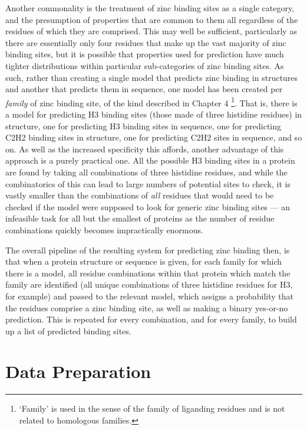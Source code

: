 Another commonality is the treatment of zinc binding sites as a single category, and the presumption of properties that are common to them all regardless of the residues of which they are comprised. This may well be sufficient, particularly as there are essentially only four residues that make up the vast majority of zinc binding sites, but it is possible that properties used for prediction have much tighter distributions within particular sub-categories of zinc binding sites. As such, rather than creating a single model that predicts zinc binding in structures and another that predicts them in sequence, one model has been created per \emph{family} of zinc binding site, of the kind described in Chapter 4 \footnote{`Family' is used in the sense of the family of liganding residues and is not related to homologous families.}. That is, there is a model for predicting H3 binding sites (those made of three histidine residues) in structure, one for predicting H3 binding sites in sequence, one for predicting C2H2 binding sites in structure, one for predicting C2H2 sites in sequence, and so on. As well as the increased specificity this affords, another advantage of this approach is a purely practical one. All the possible H3 binding sites in a protein are found by taking all combinations of three histidine residues, and while the combinatorics of this can lead to large numbers of potential sites to check, it is vastly smaller than the combinations of \emph{all} residues that would need to be checked if the model were supposed to look for generic zinc binding sites --- an infeasible task for all but the smallest of proteins as the number of residue combinations quickly becomes impractically enormous.

The overall pipeline of the resulting system for predicting zinc binding then, is that when a protein structure or sequence is given, for each family for which there is a model, all residue combinations within that protein which match the family are identified (all unique combinations of three histidine residues for H3, for example) and passed to the relevant model, which assigns a probability that the residues comprise a zinc binding site, as well as making a binary yes-or-no prediction. This is repeated for every combination, and for every family, to build up a list of predicted binding sites.

\section{Data Preparation}

